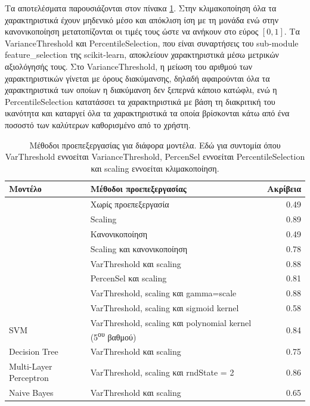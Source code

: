 Τα αποτελέσματα παρουσιάζονται στον πίνακα \ref{table:tab}. Στην κλιμακοποίηση όλα τα χαρακτηριστικά έχουν μηδενικό μέσο και απόκλιση ίση με τη μονάδα ενώ στην κανονικοποίηση μετατοπίζονται οι τιμές τους ώστε να ανήκουν στο εύρος $[0,1]$. Τα VarianceThreshold και PercentileSelection, που είναι συναρτήσεις του sub-module feature\_selection της scikit-learn, αποκλείουν χαρακτηριστικά μέσω μετρικών αξιολόγησής τους. Στο VarianceThreshold, η μείωση του αριθμού των χαρακτηριστικών γίνεται με όρους διακύμανσης, δηλαδή αφαιρούνται όλα τα χαρακτηριστικά των οποίων η διακύμανση δεν ξεπερνά κάποιο κατώφλι, ενώ η PercentileSelection κατατάσσει τα χαρακτηριστικά με βάση τη διακριτική του ικανότητα και καταργεί όλα τα χαρακτηριστικά τα οποία βρίσκονται κάτω από ένα ποσοστό των καλύτερων καθορισμένο από το χρήστη.

\begin{table}[H]
	\centering
	\begin{tabular}{@{} l l r @{}}
		\toprule
		\textbf{Μοντέλο} & \textbf{Μέθοδοι προεπεξεργασίας} & \textbf{Ακρίβεια} \\ \midrule
		 & Χωρίς προεπεξεργασία & 0.49 \\
		 & Scaling & 0.89 \\
		 & Κανονικοποίηση & 0.49 \\
		 & Scaling και κανονικοποίηση & 0.78 \\
		 & VarThreshold και scaling & 0.88 \\
		 & PercenSel και scaling & 0.81 \\
		 & VarThreshold, scaling και gamma=scale & 0.88 \\
		 & VarThreshold, scaling και sigmoid kernel & 0.58 \\
		\multirow{-9}{*}{SVM} & VarThreshold,  scaling και polynomial kernel (5\textsuperscript{ου} βαθμού) & 0.84 \\ \midrule
		Decision Tree & VarThreshold και scaling & 0.75 \\ \midrule
		Multi-Layer Perceptron & VarThreshold, scaling και rndState = 2 & 0.86 \\ \midrule
		Naive Bayes & VarThreshold και scaling & 0.65 \\ \bottomrule
	\end{tabular}
	\caption{Μέθοδοι προεπεξεργασίας για διάφορα μοντέλα. \small
	Εδώ για συντομία όπου VarThreshold εννοείται VarianceThreshold, PercenSel εννοείται PercentileSelection και scaling εννοείται κλιμακοποίηση.}
	\label{table:tab}
\end{table}

